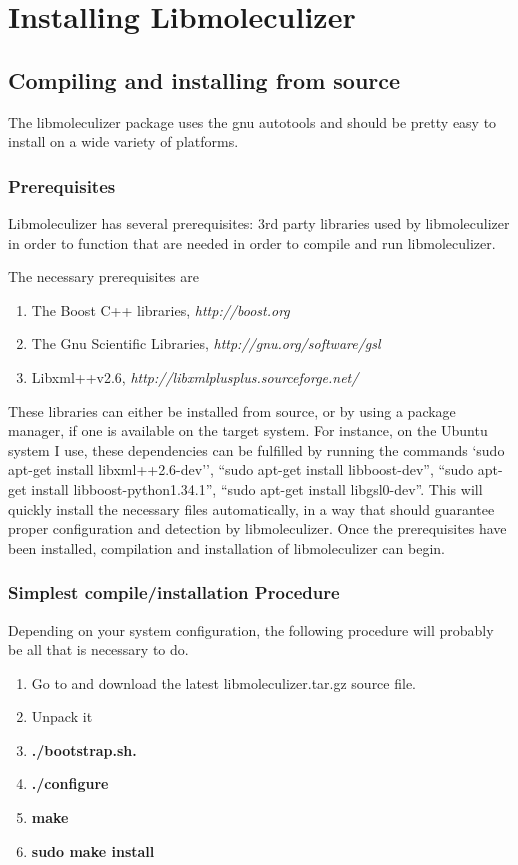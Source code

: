 \chapter{Installing Libmoleculizer}
\section{Compiling and installing from source}
The libmoleculizer package uses the gnu autotools and should be
pretty easy to install on a wide variety of platforms. 

\subsection{Prerequisites}
Libmoleculizer has several prerequisites: 3rd party libraries used by
libmoleculizer in order to function that are needed in order to
compile and run libmoleculizer.

The necessary prerequisites are
\begin{enumerate}
\item The Boost C++ libraries, \emph{http://boost.org}
\item The Gnu Scientific Libraries, \emph{http://gnu.org/software/gsl}
\item Libxml++v2.6, \emph{http://libxmlplusplus.sourceforge.net/}
\end{enumerate}

These libraries can either be installed from source, or by using a
package manager, if one is available on the target system.  For
instance, on the Ubuntu system I use, these dependencies can be
fulfilled by running the commands `sudo apt-get install
libxml++2.6-dev'', ``sudo apt-get install libboost-dev'', ``sudo apt-get
install libboost-python1.34.1'', ``sudo apt-get install
libgsl0-dev''.  This will quickly install the necessary files
automatically, in a way that should guarantee proper configuration and
detection by libmoleculizer.  Once the prerequisites have been
installed, compilation and installation of libmoleculizer can begin.

\subsection{Simplest compile/installation Procedure}
Depending on your system configuration, the following procedure will
probably be all that is necessary to do.

\begin{enumerate}
\item Go to \libmzrwebsite and download the latest
  libmoleculizer.tar.gz source file.
\item Unpack it
\item \bf{./bootstrap.sh}.
\item \bf{./configure}
\item \bf{make}
\item \bf{sudo make install}
\end{enumerate}


